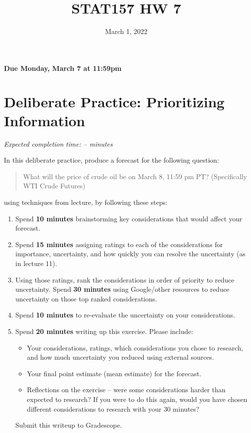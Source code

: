 \documentclass[11pt]{article}
\title{STAT157 HW 7}
\date{March 1, 2022}
\begin{document}
\maketitle

\hfill \textbf{Due Monday, March 7 at 11:59pm}

\section*{Deliberate Practice: Prioritizing Information}

\emph{Expected completion time: -- minutes}

In this deliberate practice, produce a forecast for the following question:
\begin{quote}
	What will the price of crude oil be on March 8, 11:59 pm PT? (Specifically WTI Crude Futures)
\end{quote}
using techniques from lecture, by following these steps:

\begin{enumerate}
	\item Spend \textbf{10 minutes} brainstorming key considerations that would affect your forecast. 
	\item Spend \textbf{15 minutes} assigning ratings to each of the considerations for importance, uncertainty, and how quickly you can resolve the uncertainty (as in lecture 11).
	\item Using those ratings, rank the considerations in order of priority to reduce uncertainty. Spend \textbf{30 minutes} using Google/other resources to reduce uncertainty on those top ranked considerations. 
	\item Spend \textbf{10 minutes} to re-evaluate the uncertainty on your considerations.
	\item Spend \textbf{20 minutes} writing up this exercise. Please include:
	\begin{itemize}
		\item Your considerations, ratings, which considerations you chose to research, and how much uncertainty you reduced using external sources.
		\item Your final point estimate (mean estimate) for the forecast.
		\item Reflections on the exercise -- were some considerations harder than expected to research? If you were to do this again, would you have chosen different considerations to research with your 30 minutes?
	\end{itemize}
 Submit this writeup to Gradescope.
\end{enumerate}  
\end{document}
